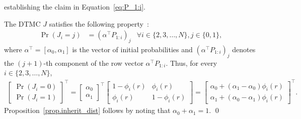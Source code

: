 \documentclass[12pt, a4paper, bibliography=totoc]{scrartcl}
\makeatletter
\let\saveqed\qed
\renewcommand\qed{%
   \ifmmode\displaymath@qed
   \else\saveqed
   \fi}
\makeatother
\begin{document}
 establishing the claim in Equation~\eqref{eq:P_1:i}.

The DTMC $J$ satisfies the following property~\citep{kulkarni2016}:
\begin{align}
    \Pr(J_i=j) &=\left(\alpha^\top P_{1:i}\right)_j &  \forall i \in\{2,3,\ldots,N\}, j\in \{0,1\},
\end{align}where $\alpha^\top =[\alpha_0,\alpha_1]$ is the vector of initial probabilities and $\left(\alpha^\top P_{1:i}\right)_j$ denotes the $(j+1)$-th component of the row vector $\alpha^\top P_{1:i}$. Thus, for every $i \in \{2,3,\ldots,N\}$,
\begin{align}
   \nonumber \begin{bmatrix}
    \Pr(J_i=0)\\
    \Pr(J_i=1)
    \end{bmatrix}^\top =
    \begin{bmatrix}
    \alpha_0\\
    \alpha_1
    \end{bmatrix}^\top 
    \begin{bmatrix}
    1-\phi_{i}(r)&\phi_{i}(r)\\
    \phi_{i}(r)&1-\phi_{i}(r)
    \end{bmatrix}
    =
    \begin{bmatrix}
    \alpha_0+(\alpha_1-\alpha_0)\phi_i(r)\\
    \alpha_1+(\alpha_0-\alpha_1)\phi_i(r) 
    \end{bmatrix}^\top.
\end{align}
Proposition~\ref{prop.inherit_dist} follows by noting that $\alpha_0 + \alpha_1 = 1$. 
\qed

\end{document}
